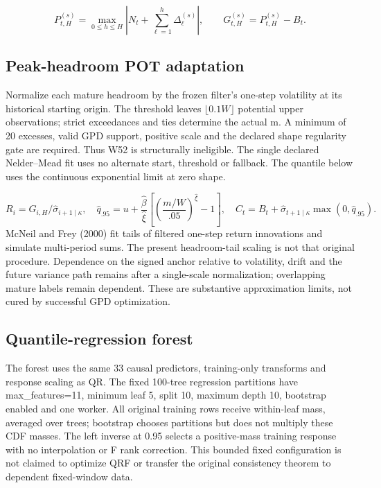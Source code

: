\documentclass[10pt,a4paper]{article}
\begin{document}
\[
P_{t,H}^{(s)}=\max_{0\le h\le H}\left|N_t+\sum_{\ell=1}^{h}\Delta_{\ell}^{(s)}\right|,\qquad G_{t,H}^{(s)}=P_{t,H}^{(s)}-B_t.
\]
\subsection*{Peak-headroom POT adaptation}
Normalize each mature headroom by the frozen filter's one-step volatility at its historical starting origin. The threshold leaves \(\lfloor0.1W\rfloor\) potential upper observations; strict exceedances and ties determine the actual m. A minimum of 20 excesses, valid GPD support, positive scale and the declared shape regularity gate are required. Thus W52 is structurally ineligible. The single declared Nelder--Mead fit uses no alternate start, threshold or fallback. The quantile below uses the continuous exponential limit at zero shape.

\[
R_i=G_{i,H}/\hat\sigma_{i+1\mid\kappa},\quad\hat q_{.95}=u+\frac{\hat\beta}{\hat\xi}\left[\left(\frac{m/W}{.05}\right)^{\hat\xi}-1\right],\quad C_t=B_t+\hat\sigma_{t+1\mid\kappa}\max(0,\hat q_{.95}).
\]
McNeil and Frey (2000) fit tails of filtered one-step return innovations and simulate multi-period sums. The present headroom-tail scaling is not that original procedure. Dependence on the signed anchor relative to volatility, drift and the future variance path remains after a single-scale normalization; overlapping mature labels remain dependent. These are substantive approximation limits, not cured by successful GPD optimization.

\subsection*{Quantile-regression forest}
The forest uses the same 33 causal predictors, training-only transforms and response scaling as QR. The fixed 100-tree regression partitions have max\_features=11, minimum leaf 5, split 10, maximum depth 10, bootstrap enabled and one worker. All original training rows receive within-leaf mass, averaged over trees; bootstrap chooses partitions but does not multiply these CDF masses. The left inverse at 0.95 selects a positive-mass training response with no interpolation or F rank correction. This bounded fixed configuration is not claimed to optimize QRF or transfer the original consistency theorem to dependent fixed-window data.
\end{document}

